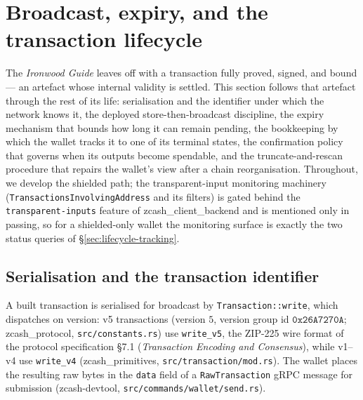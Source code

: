 \documentclass[11pt,a4paper]{article}
\theoremstyle{definition}
\begin{document}
\section{Broadcast, expiry, and the transaction lifecycle}\label{sec:lifecycle}

The \emph{Ironwood Guide} leaves off with a transaction fully proved, signed,
and bound --- an artefact whose internal validity is settled. This section
follows that artefact through the rest of its life: serialisation and the
identifier under which the network knows it, the deployed
store-then-broadcast discipline, the expiry mechanism that bounds how long it
can remain pending, the bookkeeping by which the wallet tracks it to one of
its terminal states, the confirmation policy that governs when its outputs
become spendable, and the truncate-and-rescan procedure that repairs the
wallet's view after a chain reorganisation. Throughout, we develop the
shielded path; the transparent-input monitoring machinery
(\texttt{TransactionsInvolvingAddress} and its filters) is gated behind the
\texttt{transparent-inputs} feature of \textsf{zcash\_client\_backend} and is
mentioned only in passing, so for a shielded-only wallet the monitoring
surface is exactly the two status queries of
\S\ref{sec:lifecycle-tracking}.

\subsection{Serialisation and the transaction identifier}
\label{sec:lifecycle-txid}

A built transaction is serialised for broadcast by
\texttt{Transaction::write}, which dispatches on version: v5 transactions
(version $5$, version group id $\mathtt{0x26A7270A}$;
\textsf{zcash\_protocol}, \texttt{src/constants.rs}) use \texttt{write\_v5},
the ZIP-225 wire format of the protocol specification \S7.1
(\emph{Transaction Encoding and Consensus}), while v1--v4 use
\texttt{write\_v4} (\textsf{zcash\_primitives},
\texttt{src/transaction/mod.rs}). The wallet places the resulting raw bytes
in the \texttt{data} field of a \texttt{RawTransaction} gRPC message for
submission (\textsf{zcash-devtool}, \texttt{src/commands/wallet/send.rs}).
\end{document}
